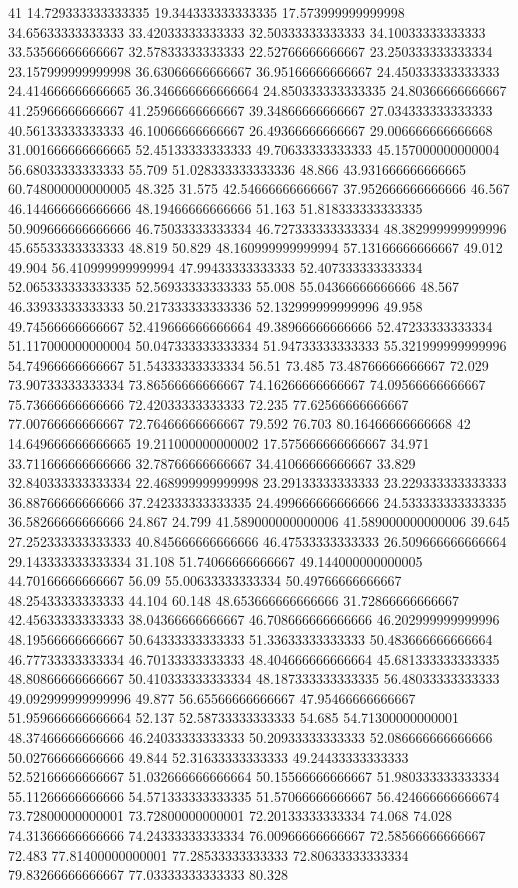 41 14.729333333333335 19.344333333333335 17.573999999999998 34.65633333333333 33.42033333333333 32.50333333333333 34.10033333333333 33.53566666666667 32.57833333333333 22.52766666666667 23.250333333333334 23.157999999999998 36.63066666666667 36.95166666666667 24.450333333333333 24.414666666666665 36.346666666666664 24.850333333333335 24.80366666666667 41.25966666666667 41.25966666666667 39.34866666666667 27.034333333333333 40.56133333333333 46.10066666666667 26.49366666666667 29.006666666666668 31.001666666666665 52.45133333333333 49.70633333333333 45.157000000000004 56.68033333333333 55.709 51.028333333333336 48.866 43.931666666666665 60.748000000000005 48.325 31.575 42.54666666666667 37.952666666666666 46.567 46.144666666666666 48.19466666666666 51.163 51.818333333333335 50.909666666666666 46.75033333333334 46.727333333333334 48.382999999999996 45.65533333333333 48.819 50.829 48.160999999999994 57.13166666666667 49.012 49.904 56.410999999999994 47.99433333333333 52.407333333333334 52.065333333333335 52.56933333333333 55.008 55.04366666666666 48.567 46.33933333333333 50.217333333333336 52.132999999999996 49.958 49.74566666666667 52.419666666666664 49.38966666666666 52.47233333333334 51.117000000000004 50.047333333333334 51.94733333333333 55.321999999999996 54.74966666666667 51.54333333333334 56.51 73.485 73.48766666666667 72.029 73.90733333333334 73.86566666666667 74.16266666666667 74.09566666666667 75.73666666666666 72.42033333333333 72.235 77.62566666666667 77.00766666666667 72.76466666666667 79.592 76.703 80.16466666666668
42 14.649666666666665 19.211000000000002 17.575666666666667 34.971 33.711666666666666 32.78766666666667 34.41066666666667 33.829 32.840333333333334 22.468999999999998 23.29133333333333 23.229333333333333 36.88766666666666 37.242333333333335 24.499666666666666 24.533333333333335 36.58266666666666 24.867 24.799 41.589000000000006 41.589000000000006 39.645 27.252333333333333 40.845666666666666 46.47533333333333 26.509666666666664 29.143333333333334 31.108 51.74066666666667 49.144000000000005 44.70166666666667 56.09 55.00633333333334 50.49766666666667 48.25433333333333 44.104 60.148 48.653666666666666 31.72866666666667 42.45633333333333 38.04366666666667 46.708666666666666 46.202999999999996 48.19566666666667 50.64333333333333 51.33633333333333 50.483666666666664 46.77733333333334 46.70133333333333 48.404666666666664 45.681333333333335 48.80866666666667 50.410333333333334 48.187333333333335 56.48033333333333 49.092999999999996 49.877 56.65566666666667 47.95466666666667 51.959666666666664 52.137 52.58733333333333 54.685 54.71300000000001 48.37466666666666 46.24033333333333 50.20933333333333 52.086666666666666 50.02766666666666 49.844 52.31633333333333 49.24433333333333 52.52166666666667 51.032666666666664 50.15566666666667 51.980333333333334 55.11266666666666 54.571333333333335 51.57066666666667 56.424666666666674 73.72800000000001 73.72800000000001 72.20133333333334 74.068 74.028 74.31366666666666 74.24333333333334 76.00966666666667 72.58566666666667 72.483 77.81400000000001 77.28533333333333 72.80633333333334 79.83266666666667 77.03333333333333 80.328
